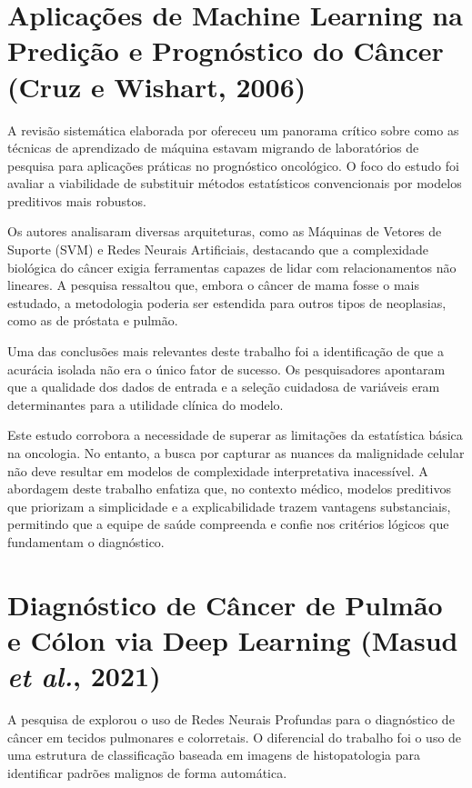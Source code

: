 \documentclass[
    12pt
    ,oneside
    ,a4paper
    ,chapter=TITLE
    ,section=TITLE
    ,sumario=abnt-6027-2012
    ,english,brazil]{abntex2} %
\begin{document}
\section{Aplicações de Machine Learning na Predição e Prognóstico do Câncer (Cruz e Wishart, 2006)}

A revisão sistemática elaborada por  ofereceu um panorama crítico sobre como as técnicas de aprendizado de máquina estavam migrando de laboratórios de pesquisa para aplicações práticas no prognóstico oncológico. O foco do estudo foi avaliar a viabilidade de substituir métodos estatísticos convencionais por modelos preditivos mais robustos.

Os autores analisaram diversas arquiteturas, como as Máquinas de Vetores de Suporte (SVM) e Redes Neurais Artificiais, destacando que a complexidade biológica do câncer exigia ferramentas capazes de lidar com relacionamentos não lineares. A pesquisa ressaltou que, embora o câncer de mama fosse o mais estudado, a metodologia poderia ser estendida para outros tipos de neoplasias, como as de próstata e pulmão.

Uma das conclusões mais relevantes deste trabalho foi a identificação de que a acurácia isolada não era o único fator de sucesso. Os pesquisadores apontaram que a qualidade dos dados de entrada e a seleção cuidadosa de variáveis eram determinantes para a utilidade clínica do modelo.

Este estudo corrobora a necessidade de superar as limitações da estatística básica na oncologia. No entanto, a busca por capturar as nuances da malignidade celular não deve resultar em modelos de complexidade interpretativa inacessível. A abordagem deste trabalho enfatiza que, no contexto médico, modelos preditivos que priorizam a simplicidade e a explicabilidade trazem vantagens substanciais, permitindo que a equipe de saúde compreenda e confie nos critérios lógicos que fundamentam o diagnóstico.

\section{Diagnóstico de Câncer de Pulmão e Cólon via Deep Learning (Masud \textit{et al.}, 2021)}

A pesquisa de  explorou o uso de Redes Neurais Profundas para o diagnóstico de câncer em tecidos pulmonares e colorretais. O diferencial do trabalho foi o uso de uma estrutura de classificação baseada em imagens de histopatologia para identificar padrões malignos de forma automática.
\end{document}
